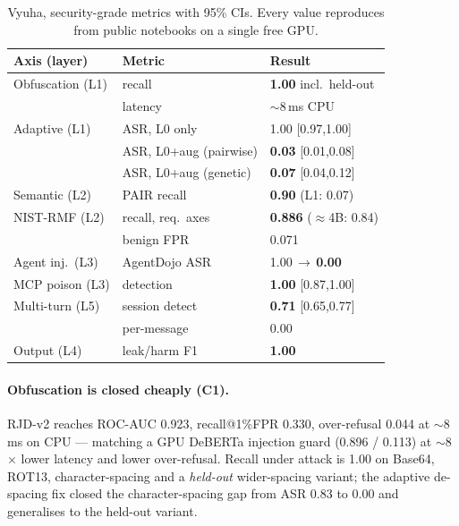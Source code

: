 \documentclass[11pt]{article}
\begin{document}
\begin{table}[t]
\centering\small
\begin{tabular}{@{}lll@{}}
\toprule
\textbf{Axis (layer)} & \textbf{Metric} & \textbf{Result} \\
\midrule
Obfuscation (L1) & recall & \textbf{1.00} incl.\ held-out \\
 & latency & $\sim$8\,ms CPU \\
Adaptive (L1) & ASR, L0 only & 1.00 [0.97,1.00] \\
 & ASR, L0+aug (pairwise) & \textbf{0.03} [0.01,0.08] \\
 & ASR, L0+aug (genetic) & \textbf{0.07} [0.04,0.12] \\
Semantic (L2) & PAIR recall & \textbf{0.90} (L1: 0.07) \\
NIST-RMF (L2) & recall, req.\ axes & \textbf{0.886} ($\approx$4B: 0.84) \\
 & benign FPR & 0.071 \\
Agent inj.\ (L3) & AgentDojo ASR & 1.00\,$\rightarrow$\,\textbf{0.00} \\
MCP poison (L3) & detection & \textbf{1.00} [0.87,1.00] \\
Multi-turn (L5) & session detect & \textbf{0.71} [0.65,0.77] \\
 & per-message & 0.00 \\
Output (L4) & leak/harm F1 & \textbf{1.00} \\
\bottomrule
\end{tabular}
\caption{Vyuha, security-grade metrics with 95\% CIs. Every value reproduces from public notebooks
on a single free GPU.}
\label{tab:main}
\end{table}

\paragraph{Obfuscation is closed cheaply (C1).} RJD-v2 reaches ROC-AUC 0.923, recall@1\%FPR 0.330,
over-refusal 0.044 at $\sim$8\,ms on CPU --- matching a GPU DeBERTa injection guard (0.896 / 0.113)
at $\sim$8$\times$ lower latency and lower over-refusal. Recall under attack is 1.00 on Base64, ROT13,
character-spacing and a \emph{held-out} wider-spacing variant; the adaptive de-spacing fix closed the
character-spacing gap from ASR 0.83 to 0.00 and generalises to the held-out variant.
\end{document}
